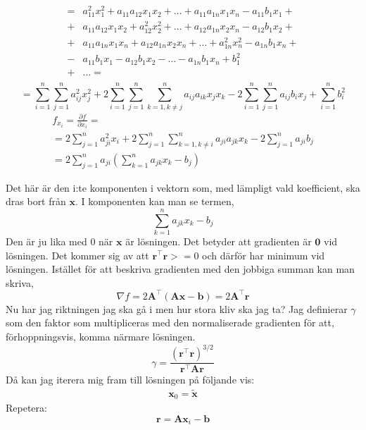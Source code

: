 \documentclass{article}
\begin{document}
\begin{align*}
    = & a_{11}^2 x_1^2 + a_{11}a_{12} x_{1}x_2 + \ldots + a_{11}a_{1n} x_1x_n - 
    a_{11}b_1x_1 +  \\
    + & a_{11}a_{12} x_1x_2 + a_{12}^2 x_2^2 + \ldots + a_{12}a_{1n} x_2x_n - 
    a_{12}b_1x_2 + \\
    + & a_{11}a_{1n} x_1x_n + a_{12}a_{1n} x_2x_n + \ldots + a_{1n}^2 x_n^2 - 
    a_{1n}b_1x_n + \\
    - & a_{11}b_1 x_1 - a_{12}b_1 x_2 - \ldots - a_{1n} b_1 x_n + 
    b_1^2  \\    
     + & \ldots = \\
\end{align*}
\[
    = \sum_{i = 1}^{n} \sum_{j=1}^{n}a_{ij}^2 x_j^2 + 2\sum_{i = 1}^{n} \sum_{j = 1}^{n} 
    \sum_{k=1, k \ne j}^{n} a_{ij}a_{ik} x_j x_k - 2 \sum_{i = 1}^{n} 
    \sum_{j = 1}^{n} a_{ij}b_i x_j + \sum_{i = 1}^{n} b_i^2
\]
\begin{gather*}
    f_{x_i} = \frac{\partial f}{\partial  x_i} = \\
    =2 \sum_{j=1}^{n} a_{ji}^2 x_i + 2 \sum_{j=1}^{n} 
    \sum_{k = 1, k \ne i}^{n}a_{ji}a_{jk} x_k
    - 2 \sum_{j=1}^{n} a_{ji} b_j \\
    = 2 \sum_{j=1}^{n} a_{ji} \left( \sum_{k = 1}^{n} a_{jk} x_k - b_j \right)    
\end{gather*}

Det här är den i:te komponenten i vektorn som, med lämpligt vald koefficient, 
ska dras bort från $\mathbf{x}$. I komponenten kan man se termen,
\[
    \sum_{k = 1}^{n} a_{jk} x_k - b_j
\]
Den är ju lika med $0$ när $\mathbf{x}$ är lösningen. Det betyder att gradienten 
är $\mathbf{0}$ vid lösningen. Det kommer sig av att 
$\mathbf{r}^\intercal\mathbf{r}>=0$ och därför har minimum 
vid lösningen.
Istället för att beskriva gradienten med den jobbiga summan kan man skriva,
\begin{equation}
    \nabla f = 2 \mathbf{A}^\intercal (\mathbf{A} \mathbf{x} - \mathbf{b}) =  2 \mathbf{A}^\intercal \mathbf{r}  
\end{equation}
Nu har jag riktningen jag ska gå i men hur stora kliv ska jag ta?
Jag definierar $\gamma$ som den faktor som multipliceras med den normaliserade
 gradienten för att, förhoppningsvis, komma närmare lösningen.
\begin{equation*}
    \gamma = \frac{(\mathbf{r}^\intercal\mathbf{r})^{3/2}}{\mathbf{r}^\intercal\mathbf{A}\mathbf{r}}
\end{equation*}
Då kan jag iterera mig fram till lösningen på följande vis:
\begin{gather*}
    \mathbf{x}_0 = \mathbf{\tilde{x} }
\end{gather*}
Repetera:
\begin{equation*}
    \mathbf{r} = \mathbf{A}\mathbf{x}_i - \mathbf{b}
\end{equation*}
\end{document}
